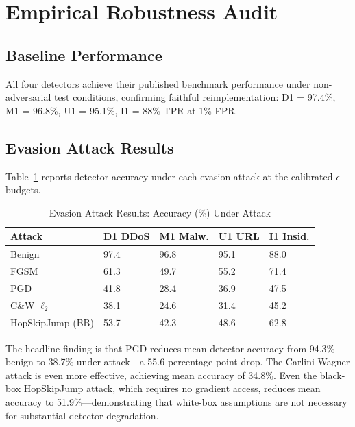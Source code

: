 \documentclass[sigconf,nonacm]{acmart}
\begin{document}
\section{Empirical Robustness Audit}
\label{sec:results}

\subsection{Baseline Performance}

All four detectors achieve their published benchmark performance under
non-adversarial test conditions, confirming faithful reimplementation:
D1 = 97.4\%, M1 = 96.8\%, U1 = 95.1\%, I1 = 88\% TPR at 1\% FPR.

\subsection{Evasion Attack Results}

Table~\ref{tab:evasion} reports detector accuracy under each evasion attack at
the calibrated $\epsilon$ budgets.

\begin{table}[h]
\caption{Evasion Attack Results: Accuracy (\%) Under Attack}
\label{tab:evasion}
\small
\begin{tabularx}{\columnwidth}{@{}p{1.6cm}*{4}{X}@{}}
\toprule
\textbf{Attack} & \textbf{D1 DDoS} & \textbf{M1 Malw.} & \textbf{U1 URL} & \textbf{I1 Insid.} \\
\midrule
Benign     & 97.4 & 96.8 & 95.1 & 88.0 \\
FGSM       & 61.3 & 49.7 & 55.2 & 71.4 \\
PGD        & 41.8 & 28.4 & 36.9 & 47.5 \\
C\&W $\ell_2$ & 38.1 & 24.6 & 31.4 & 45.2 \\
HopSkipJump (BB) & 53.7 & 42.3 & 48.6 & 62.8 \\
\bottomrule
\end{tabularx}
\end{table}

The headline finding is that PGD reduces mean detector accuracy from 94.3\%
benign to 38.7\% under attack---a 55.6 percentage point drop. The
Carlini-Wagner attack is even more effective, achieving mean accuracy of
34.8\%. Even the black-box HopSkipJump attack, which requires no gradient
access, reduces mean accuracy to 51.9\%---demonstrating that white-box
assumptions are not necessary for substantial detector degradation.
\end{document}
